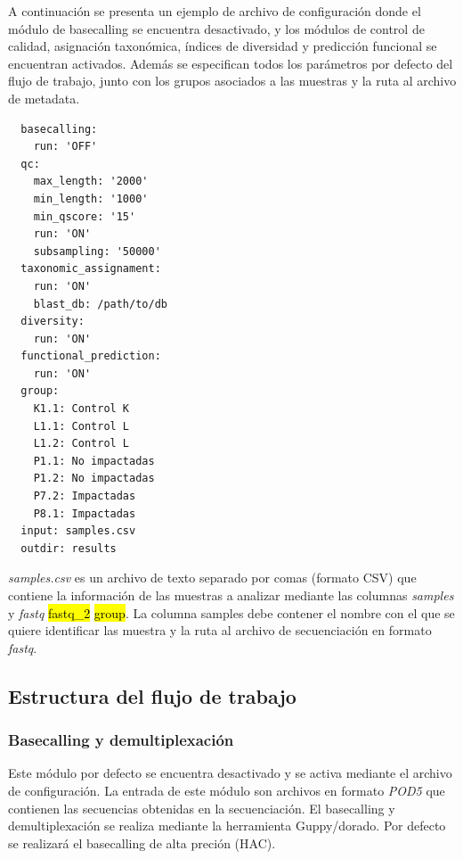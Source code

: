 A continuación se presenta un ejemplo de archivo de configuración donde el módulo de basecalling se encuentra desactivado, y los módulos de control de calidad, asignación taxonómica, índices de diversidad y predicción funcional se encuentran activados.
Además se especifican todos los parámetros por defecto del flujo de trabajo, junto con los grupos asociados a las muestras y la ruta al archivo de metadata.




\begin{verbatim}
  basecalling:
    run: 'OFF'
  qc:
    max_length: '2000'
    min_length: '1000'
    min_qscore: '15'
    run: 'ON'
    subsampling: '50000'
  taxonomic_assignament:
    run: 'ON'
    blast_db: /path/to/db
  diversity:
    run: 'ON'
  functional_prediction:
    run: 'ON'
  group:
    K1.1: Control K
    L1.1: Control L
    L1.2: Control L
    P1.1: No impactadas
    P1.2: No impactadas
    P7.2: Impactadas
    P8.1: Impactadas
  input: samples.csv
  outdir: results
\end{verbatim}
\label{verb:config}

\textit{samples.csv} es un archivo de texto separado por comas (formato CSV) que contiene la información de las muestras a analizar mediante las columnas \textit{samples} y \textit{fastq} \hl{fastq\_2} \hl{group}. 
La columna samples debe contener el nombre con el que se quiere identificar las muestra y la ruta al archivo de secuenciación en formato \textit{fastq}.

\subsection{Estructura del flujo de trabajo}
\subsubsection{Basecalling y demultiplexación}
Este módulo por defecto se encuentra desactivado y se activa mediante el archivo de configuración.
La entrada de este módulo son archivos en formato \textit{POD5} que contienen las secuencias obtenidas en la secuenciación.
El basecalling y demultiplexación se realiza mediante la herramienta Guppy/dorado. Por defecto se realizará el basecalling de alta preción (HAC).

